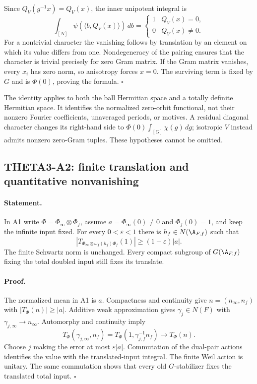 Since $Q_V(g^{-1}x)=Q_V(x)$, the inner unipotent integral is
\[
 \int_{[N]}\psi(\langle b,Q_V(x)\rangle)\,db
 =\begin{cases}1&Q_V(x)=0,\\0&Q_V(x)\ne0.\end{cases}
\]
For a nontrivial character the vanishing follows by translation by an
element on which its value differs from one. Nondegeneracy of the
pairing ensures that the character is trivial precisely for zero Gram
matrix. If the Gram matrix vanishes, every $x_i$ has zero norm, so
anisotropy forces $x=0$. The surviving term is fixed by $G$ and is
$\Phi(0)$, proving the formula. $\square$

The identity applies to both the ball Hermitian space and a totally
definite Hermitian space. It identifies the normalized zero-orbit
functional, not their nonzero Fourier coefficients, unaveraged periods,
or motives. A residual diagonal character changes its right-hand side
to $\Phi(0)\int_{[G]}\chi(g)\,dg$; isotropic $V$ instead admits
nonzero zero-Gram tuples. These hypotheses cannot be omitted.

\subsection{THETA3-A2: finite translation and quantitative nonvanishing}\label{A2}

\paragraph{Statement.}
In A1 write $\Phi=\Phi_\infty\otimes\Phi_f$, assume
$a=\Phi_\infty(0)\ne0$ and $\Phi_f(0)=1$, and keep the infinite input
fixed. For every $0<\varepsilon<1$ there is $h_f\in N(\A_{F,f})$
such that
\[
 \left|T_{\Phi_\infty\otimes\omega_f(h_f)\Phi_f}(1)\right|
                   \geq(1-\varepsilon)|a|.
\]
The finite Schwartz norm is unchanged. Every compact subgroup of
$G(\A_{F,f})$ fixing the total doubled input still fixes its translate.

\paragraph{Proof.}
The normalized mean in A1 is $a$. Compactness and continuity give
$n=(n_\infty,n_f)$ with $|T_\Phi(n)|\geq|a|$. Additive weak
approximation gives $\gamma_j\in N(F)$ with
$\gamma_{j,\infty}\longrightarrow n_\infty$. Automorphy and
continuity imply
\[
 T_\Phi(\gamma_{j,\infty},n_f)
 =T_\Phi(1,\gamma_{j,f}^{-1}n_f)
 \longrightarrow T_\Phi(n).
\]
Choose $j$ making the error at most $\varepsilon|a|$. Commutation of
the dual-pair actions identifies the value with the translated-input
integral. The finite Weil action is unitary. The same commutation shows
that every old $G$-stabilizer fixes the translated total input.
$\square$


